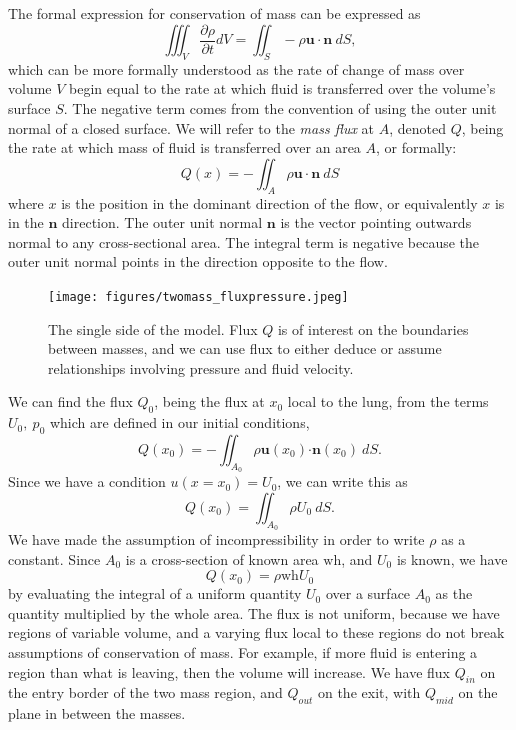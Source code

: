 \documentclass{report}
\begin{document}
The formal expression for conservation of mass can be expressed as
\begin{equation}
    \iiint_V \frac{\partial\rho}{\partial t}dV = \iint_S -\rho \bm{u\cdot n}~dS,
    \label{eqn:cons_mass_formal}
\end{equation}
which can be more formally understood as the rate of change of mass over volume $V$ begin equal to the rate at which fluid is transferred over the volume's surface $S$. 
The negative term comes from the convention of using the outer unit normal of a closed surface.
We will refer to the \textit{mass flux} at $A$, denoted $Q$, being the rate at which mass of fluid is transferred over an area $A$, or formally:
\begin{equation}
    Q(x) = -\iint_A \rho \bm{u \cdot n}~dS
\end{equation}
where $x$ is the position in the dominant direction of the flow, or equivalently $x$ is in the $\mathbf{n}$ direction.
The outer unit normal $\mathbf{n}$ is the vector pointing outwards normal to any cross-sectional area. 
The integral term is negative because the outer unit normal points in the direction opposite to the flow.

\begin{figure}[h]
    \centering
    \texttt{[image: figures/twomass\_fluxpressure.jpeg]}
    \caption{The single side of the model.
    Flux $Q$ is of interest on the boundaries between masses,
    and we can use flux to either deduce or assume relationships involving pressure and fluid velocity.
    }
    \label{fig:twomass_fluxpressure}
\end{figure}

We can find the flux $Q_0$, being the flux at $x_0$ local to the lung, from the terms $U_0,~p_0$ which are defined in our initial conditions,
\begin{equation}
    Q(x_0) = -\iint_{A_0} \rho \bm{u}(x_0)\bm{\cdot n}(x_0)~dS.
\end{equation}
Since we have a condition $u(x=x_0) = U_0$, we can write this as
\begin{equation}
    Q(x_0) = \iint_{A_0} \rho U_0~dS.
\end{equation}
We have made the assumption of incompressibility in order to write $\rho$ as a constant.
Since $A_0$ is a cross-section of known area $\mathrm{\mathrm{wh}}$, and $U_0$ is known, we have
\begin{equation}
    Q(x_0) = \rho \mathrm{wh} U_0
    \label{eqn:twomass_lung_flux}
\end{equation}
by evaluating the integral of a uniform quantity $U_0$ over a surface $A_0$ as the quantity multiplied by the whole area.
The flux is not uniform, because we have regions of variable volume, and a varying flux local to these regions do not break assumptions of conservation of mass.
For example, if more fluid is entering a region than what is leaving, then the volume will increase.
We have flux $Q_{in}$ on the entry border of the two mass region, and $Q_{out}$ on the exit,
with $Q_{mid}$ on the plane in between the masses.
\end{document}
